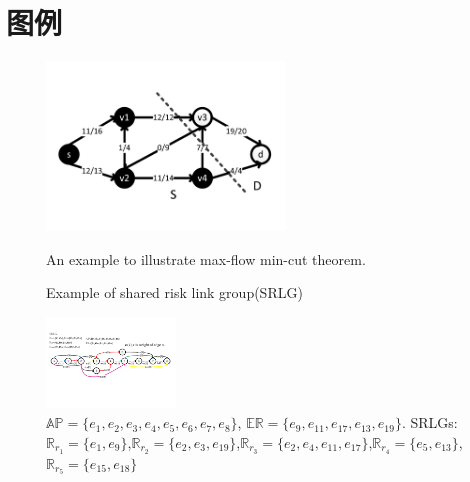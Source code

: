 ﻿

\newpage
\thispagestyle{fancy}
\fancyhf{} %
\setcounter{page}{1}
\fancyfoot[C]{\bfseries\thepage}
\fancyhead[CO]{\bfseries\rightmark}
\fancyhead[RE]{\bfseries\leftmark}
\renewcommand{\headrulewidth}{0.4pt}
\renewcommand{\footrulewidth}{0pt}
\section*{图例}
\begin{figure}
  \centering
  \includegraphics[width=2.5in]{franz//FlowNetwork}\\
  \caption{An example to illustrate max-flow min-cut theorem.}
  \label{fig:FlowNetwork}
\end{figure}
\begin{figure}

  \centering
{}
\caption{Example of shared risk link group(SRLG)}\label{fig:SRLGgraph}
\label{fig:Logic shift operation}

\end{figure}
\begin{figure}[tp]
  \centering
  \includegraphics[width=1.35in]{franz/InitialGraph}
  \caption{$\mathbb{AP}=\{e_1,e_2,e_3,e_4,e_5,e_6,e_7,e_8\}$, $\mathbb{\mathbb{ER}}=\{e_9,e_{11},e_{17},e_{13},e_{19}\}$.  SRLGs: $\mathbb{R}_{r_1}=\{e_1,e_9\}$,$\mathbb{R}_{r_2}=\{e_2,e_3,e_{19}\}$,$\mathbb{R}_{r_3}=\{e_2,e_4,e_{11},e_{17}\}$,$\mathbb{R}_{r_4}=\{e_5,e_{13}\}$,$\mathbb{R}_{r_5}=\{e_{15},e_{18}\}$}\label{fig:Initial Graph}
\end{figure}

